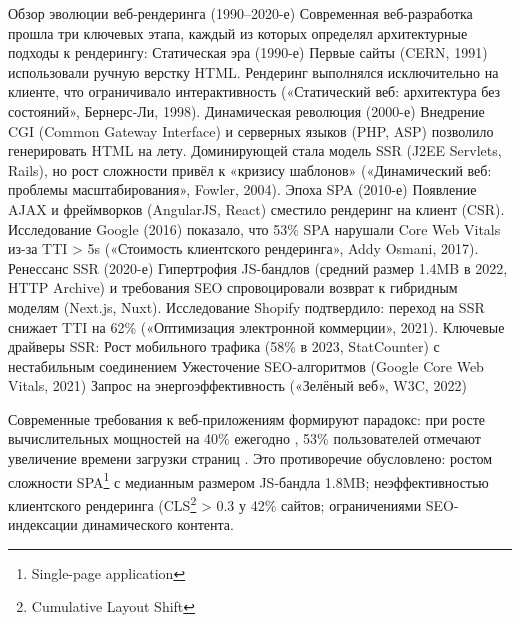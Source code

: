 
Обзор эволюции веб-рендеринга (1990–2020-е) Современная веб-разработка прошла три ключевых этапа, каждый из которых определял архитектурные подходы к рендерингу:
 Статическая эра (1990-е) Первые сайты (CERN, 1991) использовали ручную верстку HTML. Рендеринг выполнялся исключительно на клиенте, что ограничивало интерактивность («Статический веб: архитектура без состояний», Бернерс-Ли, 1998).
Динамическая революция (2000-е) Внедрение CGI (Common Gateway Interface) и серверных языков (PHP, ASP) позволило генерировать HTML на лету. Доминирующей стала модель SSR (J2EE Servlets, Rails), но рост сложности привёл к «кризису шаблонов» («Динамический веб: проблемы масштабирования», Fowler, 2004).
Эпоха SPA (2010-е) Появление AJAX и фреймворков (AngularJS, React) сместило рендеринг на клиент (CSR). Исследование Google (2016) показало, что 53\% SPA нарушали Core Web Vitals из-за TTI > 5s («Стоимость клиентского рендеринга», Addy Osmani, 2017).
Ренессанс SSR (2020-е) Гипертрофия JS-бандлов (средний размер 1.4MB в 2022, HTTP Archive) и требования SEO спровоцировали возврат к гибридным моделям (Next.js, Nuxt). Исследование Shopify подтвердило: переход на SSR снижает TTI на 62\% («Оптимизация электронной коммерции», 2021).
Ключевые драйверы SSR:
Рост мобильного трафика (58\% в 2023, StatCounter) с нестабильным соединением
Ужесточение SEO-алгоритмов (Google Core Web Vitals, 2021)
Запрос на энергоэффективность («Зелёный веб», W3C, 2022)

Современные требования к веб-приложениям формируют парадокс: при росте вычислительных мощностей на 40\% ежегодно \cite{moore2023web}, 53\% пользователей отмечают увеличение времени загрузки страниц \cite{akamai2022}.
Это противоречие обусловлено:
ростом сложности SPA\footnote{Single-page application} с медианным размером JS-бандла 1.8MB;
неэффективностью клиентского рендеринга (CLS\footnote{Cumulative Layout Shift} > 0.3 у 42\% сайтов;
ограничениями SEO-индексации динамического контента.



